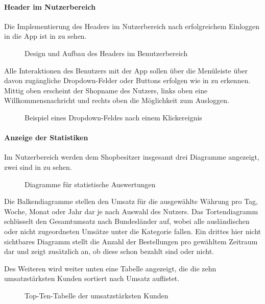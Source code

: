 \paragraph{Header im Nutzerbereich}
Die Implementierung des Headers im Nutzerbereich nach erfolgreichem Einloggen in die App ist in  zu sehen.
\begin{figure}[htb]
\centering
{}
\caption{Design und Aufbau des Headers im Benutzerbereich}
\label{fig:nutzerbereich}
\end{figure}
Alle Interaktionen des Benutzers mit der App sollen über die Menüleiste über davon zugängliche Dropdown-Felder oder Buttons erfolgen wie in  zu erkennen. Mittig oben erscheint der Shopname des Nutzers, links oben eine Willkommensnachricht und rechts oben die Möglichkeit zum Ausloggen.
 \begin{figure}[htb]
\centering
{}
\caption{Beispiel eines Dropdown-Feldes nach einem Klickereignis}
\label{fig:dropdown}
\end{figure}
\paragraph{Anzeige der Statistiken}
Im Nutzerbereich werden dem Shopbesitzer insgesamt drei Diagramme angezeigt, zwei sind in  zu sehen.
\begin{figure}[htb]
\centering
{}
\caption{Diagramme für statistische Auswertungen}
\label{fig:umsatz}
\end{figure}
Die Balkendiagramme stellen den Umsatz für die ausgewählte Währung pro Tag, Woche, Monat oder Jahr dar je nach Auswahl des Nutzers. Das Tortendiagramm schlüsselt den Gesamtumsatz nach Bundesländer auf, wobei alle ausländischen oder nicht zugeordneten Umsätze unter die Kategorie  fallen. Ein drittes hier nicht sichtbares Diagramm stellt die Anzahl der Bestellungen pro gewähltem Zeitraum dar und zeigt zusätzlich an, ob diese schon bezahlt sind oder nicht.

Des Weiteren wird weiter unten eine Tabelle angezeigt, die die zehn umsatzstärksten Kunden sortiert nach Umsatz auflistet.
\begin{figure}[htb]
\centering
{}
\caption{Top-Ten-Tabelle der umsatzstärksten Kunden}
\label{fig:umsatz}
\end{figure}


